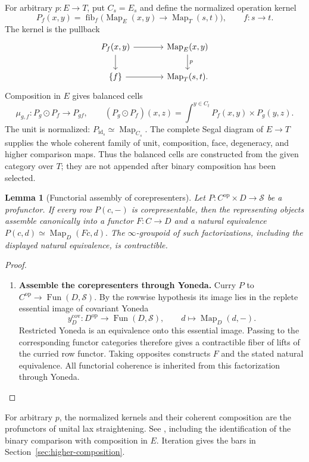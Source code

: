 \documentclass[oneside]{article}
\theoremstyle{plain}
\newtheorem{lemma}[theorem]{Lemma}
\theoremstyle{definition}
\theoremstyle{remark}
\newcommand{\Fun}{\operatorname{Fun}}
\newcommand{\Map}{\operatorname{Map}}
\newcommand{\Sps}{\mathcal S}
\newcommand{\fib}{\operatorname{fib}}
\newcommand{\id}{\operatorname{id}}
\newcommand{\op}{\mathrm{op}}
\begin{document}
For arbitrary $p:E\to T$, put $C_s=E_s$ and define the normalized
operation kernel
\begin{equation}\label{thz:eq:kernel}
 P_f(x,y)=\fib_f\bigl(
   \Map_E(x,y)\longrightarrow\Map_T(s,t)
 \bigr),
 \qquad f:s\to t.
\end{equation}
The kernel is the pullback
\[
\begin{tikzcd}[column sep=large]
 P_f(x,y)\ar[r]\ar[d]&\Map_E(x,y)\ar[d,"p"]\\
 \{f\}\ar[r]&\Map_T(s,t).
\end{tikzcd}
\]
Composition in $E$ gives balanced cells
\[
 \mu_{g,f}:P_g\odot P_f\longrightarrow P_{gf},\qquad
 (P_g\odot P_f)(x,z)=
 \int^{y\in C_t}P_f(x,y)\times P_g(y,z).
\]
The unit is normalized:
$P_{\id_s}\simeq\Map_{C_s}$.  The complete Segal diagram of
$E\to T$ supplies the whole coherent family of unit, composition, face,
degeneracy, and higher comparison maps.  Thus the balanced cells are
constructed from the given category over $T$; they are not appended after
binary composition has been selected.

\begin{lemma}[Functorial assembly of corepresenters]\label{thz:lem:corep-assembly}
Let $P:C^{\op}\times D\to\Sps$ be a profunctor.  If every row
$P(c,-)$ is corepresentable, then the representing objects assemble
canonically into a functor $F:C\longrightarrow D$ and a natural equivalence $P(c,d)\simeq\Map_D(Fc,d).$ The $\infty$-groupoid of such factorizations, including the displayed
natural equivalence, is contractible.
\end{lemma}
\begin{proof}
\leavevmode
\begin{enumerate}
\item \textbf{Assemble the corepresenters through Yoneda.} Curry $P$ to
$C^{\op}\to\Fun(D,\Sps)$.  By the rowwise hypothesis its image
lies in the replete essential image of covariant Yoneda
\[
 y_D^{\mathrm{cov}}:D^{\op}\longrightarrow\Fun(D,\Sps),
 \qquad d\longmapsto\Map_D(d,-).
\]
Restricted Yoneda is an equivalence onto this essential image.  Passing to
the corresponding functor categories therefore gives a contractible fiber
of lifts of the curried row functor.  Taking opposites constructs $F$ and
the stated natural equivalence.  All functorial coherence is inherited from this factorization through Yoneda.\qedhere
\end{enumerate}
\end{proof}

For arbitrary $p$, the normalized kernels and their coherent composition
are the profunctors of unital lax straightening. See
\cite[Cor.~6.2 and \S8, eq.~(2)]{Blom2024}, including the identification of
the binary comparison with composition in $E$.
Iteration gives the bars in Section~\ref{sec:higher-composition}.
\end{document}
